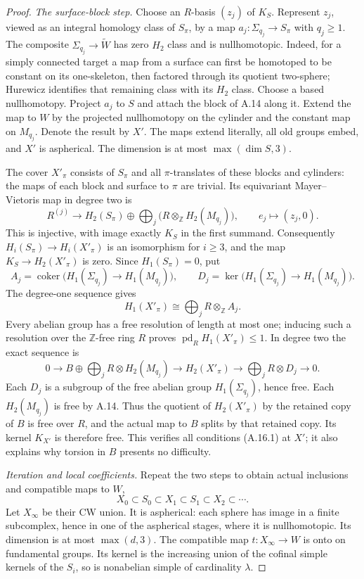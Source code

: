 \begin{proof}
\emph{The surface-block step.}
Choose an $R$-basis $(z_j)$ of $K_S$. Represent $z_j$, viewed as
an integral homology class of $S_\pi$, by a map
$a_j:\Sigma_{q_j}\to S_\pi$ with $q_j\geq1$. The composite
$\Sigma_{q_j}\to\widetilde W$ has zero $H_2$ class and is
nullhomotopic. Indeed, for a simply connected target a map from
a surface can first be homotoped to be constant on its
one-skeleton, then factored through its quotient two-sphere;
Hurewicz identifies that remaining class with its $H_2$ class.
Choose a based nullhomotopy. Project $a_j$ to $S$ and attach the
block of A.14 along it. Extend the map to $W$ by the projected
nullhomotopy on the cylinder and the constant map on $M_{q_j}$.
Denote the result by $X'$. The maps extend literally, all old
groups embed, and $X'$ is aspherical. The dimension is at most
$\max(\dim S,3)$.

The cover $X'_\pi$ consists of $S_\pi$ and all $\pi$-translates
of these blocks and cylinders: the maps of each block and
surface to $\pi$ are trivial. Its equivariant Mayer--Vietoris map
in degree two is
\[
 R^{(j)}\longrightarrow H_2(S_\pi)\oplus
         \bigoplus_j\bigl(R\otimes_{\mathbb Z}H_2(M_{q_j})\bigr),
 \qquad e_j\longmapsto(z_j,0).
 \tag{A.16.3}
\]
This is injective, with image exactly $K_S$ in the first summand.
Consequently $H_i(S_\pi)\to H_i(X'_\pi)$ is an isomorphism for
$i\geq3$, and the map $K_S\to H_2(X'_\pi)$ is zero.
Since $H_1(S_\pi)=0$, put
\[
 A_j=\operatorname{coker}\bigl(H_1(\Sigma_{q_j})\to H_1(M_{q_j})\bigr),
 \qquad
 D_j=\ker\bigl(H_1(\Sigma_{q_j})\to H_1(M_{q_j})\bigr).
\]
The degree-one sequence gives
\[
 H_1(X'_\pi)\cong\bigoplus_j R\otimes_{\mathbb Z}A_j.
\]
Every abelian group has a free resolution of length at most one;
inducing such a resolution over the $\mathbb Z$-free ring $R$
proves $\operatorname{pd}_R H_1(X'_\pi)\leq1$.
In degree two the exact sequence is
\[
 0\longrightarrow
 B\oplus\bigoplus_j R\otimes H_2(M_{q_j})
 \longrightarrow H_2(X'_\pi)
 \longrightarrow\bigoplus_j R\otimes D_j
 \longrightarrow0.
 \tag{A.16.4}
\]
Each $D_j$ is a subgroup of the free abelian group
$H_1(\Sigma_{q_j})$, hence free. Each $H_2(M_{q_j})$ is free
by A.14. Thus the quotient of $H_2(X'_\pi)$ by the retained
copy of $B$ is free over $R$, and the actual map to $B$ splits
by that retained copy. Its kernel $K_{X'}$ is therefore free.
This verifies all conditions (A.16.1) at $X'$; it also explains
why torsion in $B$ presents no difficulty.

\emph{Iteration and local coefficients.}
Repeat the two steps to obtain actual inclusions and compatible
maps to $W$,
\[
 X_0\subset S_0\subset X_1\subset S_1\subset X_2\subset\cdots.
\]
Let $X_\infty$ be their CW union. It is aspherical: each sphere
has image in a finite subcomplex, hence in one of the aspherical
stages, where it is nullhomotopic. Its dimension is at most
$\max(d,3)$. The compatible map $t:X_\infty\to W$ is onto on
fundamental groups. Its kernel is the increasing union of the
cofinal simple kernels of the $S_i$, so is nonabelian simple
of cardinality $\lambda$.


\end{proof}

